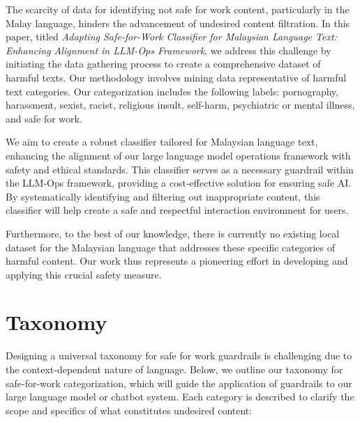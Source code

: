 \documentclass[preprint]{article}
\begin{document}
The scarcity of data for identifying not safe for work content, particularly in the Malay language, hinders the advancement of undesired content filtration. In this paper, titled \textit{Adapting Safe-for-Work Classifier for Malaysian Language Text: Enhancing Alignment in LLM-Ops Framework}, we address this challenge by initiating the data gathering process to create a comprehensive dataset of harmful texts. Our methodology involves mining data representative of harmful text categories. Our categorization includes the following labels: pornography, harassment, sexist, racist, religious insult, self-harm, psychiatric or mental illness, and safe for work.

We aim to create a robust classifier tailored for Malaysian language text, enhancing the alignment of our large language model operations framework with safety and ethical standards. This classifier serves as a necessary guardrail within the LLM-Ops framework, providing a cost-effective solution for ensuring safe AI. By systematically identifying and filtering out inappropriate content, this classifier will help create a safe and respectful interaction environment for users.

Furthermore, to the best of our knowledge, there is currently no existing local dataset for the Malaysian language that addresses these specific categories of harmful content. Our work thus represents a pioneering effort in developing and applying this crucial safety measure.

\section{Taxonomy}

Designing a universal taxonomy for safe for work guardrails is challenging due to the context-dependent nature of language. Below, we outline our taxonomy for safe-for-work categorization, which will guide the application of guardrails to our large language model or chatbot system. Each category is described to clarify the scope and specifics of what constitutes undesired content:
\end{document}
